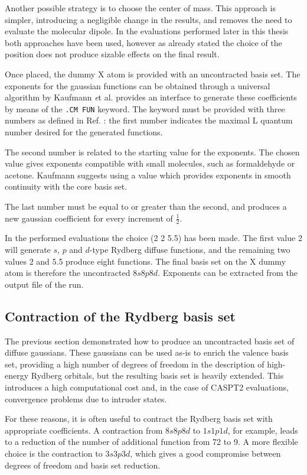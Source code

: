 Another possible strategy is to choose the center of mass. This approach is
simpler, introducing a negligible change in the results, and removes the
need to evaluate the molecular dipole. In the evaluations performed later in
this thesis both approaches have been used, however as already stated
the choice of the position does not produce sizable effects on
the final result.

Once placed, the dummy X atom is provided with an uncontracted basis set.
The exponents for the gaussian functions can be obtained through a
universal algorithm by Kaufmann {\textit et al}\cite{jpb-22-2223-1989}.
\dalton provides an interface to generate these coefficients by means of the
\texttt{.CM FUN} keyword.  The keyword must be provided with three
numbers as defined in Ref. : the first number
indicates the maximal L quantum number desired for the generated functions.

The second number is related to the starting value for the exponents. The
chosen value gives exponents compatible with small molecules, such as
formaldehyde or acetone.  Kaufmann suggests using a value which provides
exponents in smooth continuity with the core basis set. 

The last number must be equal to or greater than the second, and produces a
new gaussian coefficient for every increment of $\frac{1}{2}$. 

In the performed evaluations the choice (2 2 5.5) has been made.
The first value 2 will generate $s$, $p$ and $d$-type Rydberg diffuse
functions, and the remaining two values 2 and 5.5 produce eight functions.
The final basis set on the X dummy atom is therefore the uncontracted
$8s8p8d$.  Exponents can be extracted from the output file of the \dalton
run.

\subsection*{Contraction of the Rydberg basis set}

The previous section demonstrated how to produce an uncontracted basis set
of diffuse gaussians. These gaussians can be used as-is to enrich the valence
basis set, providing a high number of degrees of freedom in the description of
high-energy Rydberg orbitals, but the resulting basis set is heavily
extended. This introduces a high computational cost and, in the case of
CASPT2 evaluations, convergence problems due to intruder states. 

For these reasons, it is often useful to contract the Rydberg basis set with
appropriate coefficients. A contraction from $8s8p8d$ to $1s1p1d$, for
example, leads to a reduction of the number of additional function from 72
to 9.  A more flexible choice is the contraction to $3s3p3d$, which gives a
good compromise between degrees of freedom and basis set reduction.


